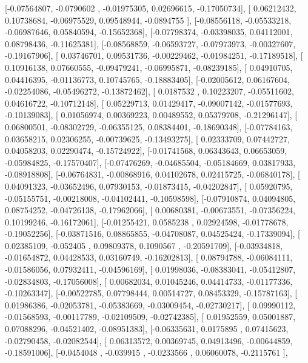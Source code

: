 \documentclass{article}
\begin{document}
       [-0.07564807, -0.0790602 , -0.01975305,  0.02696615, -0.17050734],
       [ 0.06212432,  0.10738684, -0.06975529,  0.09548944, -0.0894755 ],
       [-0.08556118, -0.05533218, -0.06987646,  0.05840594, -0.15652368],
       [-0.07798374, -0.03398035,  0.04112001,  0.08798436, -0.11625381],
       [-0.08568859, -0.06593727, -0.07973973, -0.00327607, -0.19167906],
       [ 0.03746701,  0.09531736, -0.00229462, -0.01984251, -0.17189518],
       [ 0.10916138,  0.07660555, -0.09479241, -0.06995871, -0.08239185],
       [ 0.04910705,  0.04416395, -0.01136773,  0.10745765, -0.18883405],
       [-0.02005612,  0.06167604, -0.02254086, -0.05496272, -0.13872462],
       [ 0.0187532 ,  0.10223207, -0.05511602,  0.04616722, -0.10712148],
       [ 0.05229713,  0.01429417, -0.09007142, -0.01577693, -0.10139083],
       [ 0.01056974,  0.00369223,  0.00489552,  0.05379708, -0.21296147],
       [ 0.06800501, -0.08302729, -0.06355125,  0.08384401, -0.18690348],
       [-0.07784163,  0.03658215,  0.02306255, -0.00739625, -0.13493275],
       [ 0.02333709,  0.07442727,  0.04058203,  0.02290474, -0.15724922],
       [-0.01741568,  0.06343643,  0.06653059, -0.05984825, -0.17570407],
       [-0.07476269, -0.04685504, -0.05184669,  0.03817933, -0.08918808],
       [-0.06764831, -0.00868916,  0.04102678,  0.02415725, -0.06840178],
       [ 0.04091323, -0.03652496,  0.07930153, -0.01873415, -0.04202847],
       [ 0.05920795, -0.05155751, -0.00218008, -0.04102441, -0.10598598],
       [-0.07910874,  0.04094805,  0.08754252, -0.04726138, -0.17962066],
       [ 0.00680381, -0.00673551, -0.07356224,  0.10199246, -0.16172061],
       [-0.01255421,  0.0585238 ,  0.02924598, -0.01778678, -0.19052256],
       [-0.03871516,  0.08865855, -0.04708087,  0.04525424, -0.17339094],
       [ 0.02385109, -0.052405  ,  0.09809378,  0.1090567 , -0.20591709],
       [-0.03934818, -0.01654872,  0.04428533,  0.03160749, -0.16202813],
       [ 0.08794788, -0.06084111, -0.01586056,  0.07932411, -0.04596169],
       [ 0.01998036, -0.08383041, -0.05412807, -0.02834803, -0.17056008],
       [ 0.00682034,  0.01045246,  0.04414733, -0.01177336, -0.10263347],
       [-0.00522785,  0.07798444,  0.00514727,  0.08453329, -0.15787163],
       [ 0.01986386, -0.02053781, -0.05383669, -0.03009454, -0.02730217],
       [ 0.09990112, -0.01568593, -0.00117789, -0.02109509, -0.02742385],
       [ 0.01952559,  0.05001887,  0.07088296, -0.04521402, -0.08951383],
       [-0.06335631,  0.0175895 ,  0.07415623, -0.02790458, -0.02082544],
       [ 0.06313572,  0.00369745,  0.04913496, -0.00644859, -0.18591006],
       [-0.0454048 , -0.039915  , -0.0233566 ,  0.06060078, -0.2115761 ],
\end{document}
